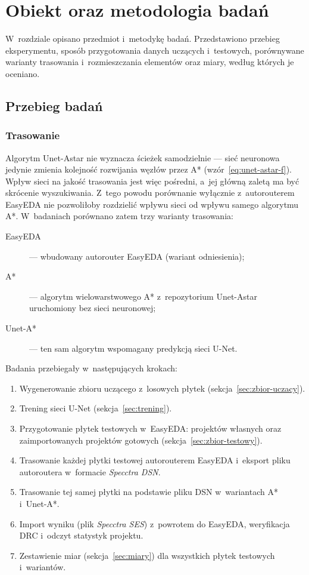 \chapter{Obiekt oraz metodologia badań}
\label{ch:rozwiniecie}

W~rozdziale opisano przedmiot i~metodykę badań. Przedstawiono
przebieg eksperymentu, sposób przygotowania danych uczących i~testowych,
porównywane warianty trasowania i~rozmieszczania elementów oraz miary,
według których je oceniano.

\section{Przebieg badań}
\label{sec:przebieg-badan}

\subsection{Trasowanie}
\label{sec:przebieg-trasowanie}

Algorytm Unet-Astar nie wyznacza ścieżek samodzielnie --- sieć neuronowa
jedynie zmienia kolejność rozwijania węzłów przez A*
(wzór~\ref{eq:unet-astar-f}). Wpływ sieci na jakość trasowania jest więc
pośredni, a~jej główną zaletą ma być skrócenie wyszukiwania. Z~tego powodu
porównanie wyłącznie z~autorouterem EasyEDA nie pozwoliłoby rozdzielić wpływu
sieci od wpływu samego algorytmu A*. W~badaniach porównano zatem trzy warianty
trasowania:
\begin{description}
  \item[EasyEDA] --- wbudowany autorouter EasyEDA (wariant odniesienia);
  \item[A*] --- algorytm wielowarstwowego A* z~repozytorium Unet-Astar
    uruchomiony bez sieci neuronowej;
  \item[Unet-A*] --- ten sam algorytm wspomagany predykcją sieci U-Net.
\end{description}

Badania przebiegały w~następujących krokach:
\begin{enumerate}
  \item Wygenerowanie zbioru uczącego z~losowych płytek
    (sekcja~\ref{sec:zbior-uczacy}).
  \item Trening sieci U-Net (sekcja~\ref{sec:trening}).
  \item Przygotowanie płytek testowych w~EasyEDA: projektów własnych oraz
    zaimportowanych projektów gotowych (sekcja~\ref{sec:zbior-testowy}).
  \item Trasowanie każdej płytki testowej autorouterem EasyEDA i~eksport
    pliku autoroutera w~formacie \emph{Specctra DSN}.
  \item Trasowanie tej samej płytki na podstawie pliku DSN w~wariantach A*
    i~Unet-A*.
  \item Import wyniku (plik \emph{Specctra SES}) z~powrotem do EasyEDA,
    weryfikacja DRC i~odczyt statystyk projektu.
  \item Zestawienie miar (sekcja~\ref{sec:miary}) dla wszystkich płytek
    testowych i~wariantów.
\end{enumerate}


